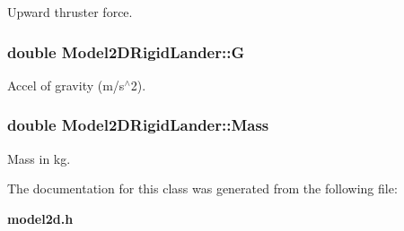 Upward thruster force.

\subsubsection{\setlength{\rightskip}{0pt plus 5cm}double Model2DRigid\-Lander::G}\label{class_Model2DRigidLander_m1}


Accel of gravity (m/s$^\wedge$2).

\subsubsection{\setlength{\rightskip}{0pt plus 5cm}double Model2DRigid\-Lander::Mass}\label{class_Model2DRigidLander_m0}


Mass in kg.



The documentation for this class was generated from the following file:\begin{CompactItemize}
\item 
{\bf model2d.h}\end{CompactItemize}
